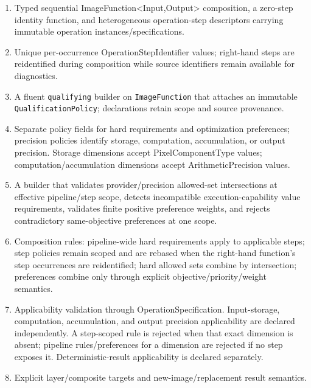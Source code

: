 \begin{enumerate}
  \item Typed sequential ImageFunction<Input,Output> composition, a zero-step identity function, and heterogeneous operation-step descriptors carrying immutable operation instances/specifications.
  \item Unique per-occurrence OperationStepIdentifier values; right-hand steps are reidentified during composition while source identifiers remain available for diagnostics.
  \item A fluent \texttt{qualifying} builder on \texttt{ImageFunction} that attaches an immutable \texttt{QualificationPolicy}; declarations retain scope and source provenance.
  \item Separate policy fields for hard requirements and optimization preferences; precision policies identify storage, computation, accumulation, or output precision. Storage dimensions accept PixelComponentType values; computation/accumulation dimensions accept ArithmeticPrecision values.
  \item A builder that validates provider/precision allowed-set intersections at effective pipeline/step scope, detects incompatible execution-capability value requirements, validates finite positive preference weights, and rejects contradictory same-objective preferences at one scope.
  \item Composition rules: pipeline-wide hard requirements apply to applicable steps; step policies remain scoped and are rebased when the right-hand function's step occurrences are reidentified; hard allowed sets combine by intersection; preferences combine only through explicit objective/priority/weight semantics.
  \item Applicability validation through OperationSpecification. Input-storage, computation, accumulation, and output precision applicability are declared independently. A step-scoped rule is rejected when that exact dimension is absent; pipeline rules/preferences for a dimension are rejected if no step exposes it. Deterministic-result applicability is declared separately.
  \item Explicit layer/composite targets and new-image/replacement result semantics.
\end{enumerate}

